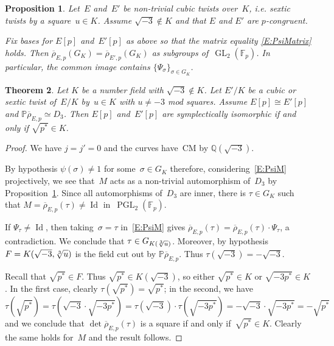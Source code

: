 \documentclass[12pt, reqno]{amsart}
\newcommand{\F}{\mathbb{F}}
\newcommand{\PP}{\mathbb{P}}
\newcommand{\Q}{\mathbb{Q}}
\newcommand{\rhobar}{{\overline{\rho}}}
\newcommand{\GL}{\operatorname{GL}}
\newcommand{\PGL}{\operatorname{PGL}}
\DeclareMathOperator{\Id}{Id}
\numberwithin{equation}{section}
\newtheorem{theorem}{Theorem}[section]
\newtheorem{proposition}[theorem]{Proposition}
\theoremstyle{definition}
\theoremstyle{remark}
\begin{document}
\begin{proposition} \label{P:PsiInImage}
Let~$E$ and~$E'$ be non-trivial cubic twists over~$K$, i.e. sextic twists by a square~$u \in K$. Assume $\sqrt{-3} \not\in K$ and that $E$ and $E'$ are $p$-congruent.

Fix bases for $E[p]$ and~$E'[p]$ as above so that the matrix equality \eqref{E:PsiMatrix} holds. Then 
$\rhobar_{E,p}(G_K) = \rhobar_{E',p}(G_K)$ 
as subgroups of~$\GL_2(\F_p)$. In particular, the common image contains $\{ \Psi_\sigma \}_{\sigma \in G_K}$.
\end{proposition}


\begin{theorem}\label{T:cubicM} 
Let $K$ be a number field with $\sqrt{-3} \not\in K$. 
Let $E'/K$ be a cubic or sextic twist of~$E/K$ by~$u \in K$ with $u \neq -3$ mod squares. Assume $E[p] \cong E'[p]$
and $\PP \rhobar_{E,p} \simeq D_3$.
Then $E[p]$ and~$E'[p]$ are symplectically isomorphic if and only if
$\sqrt{p^*} \in K$.
\end{theorem}
\begin{proof} We have $j=j'=0$ and the curves have~CM by $\Q(\sqrt{-3})$.

By hypothesis $\psi(\sigma) \neq 1$ for some~$\sigma \in G_K$ therefore, 
considering~\eqref{E:PsiM} projectively, we see that~$M$ acts as a non-trivial automorphism of~$D_3$ by Proposition~\ref{P:PsiInImage}.
Since all automorphisms of~$D_3$ are inner, 
there is $\tau \in G_K$ such that 
$M = \rhobar_{E,p}(\tau) \neq \Id$ in~$\PGL_2(\F_p)$.

If $\Psi_\tau \neq \Id$, then   
taking~$\sigma = \tau$ in~\eqref{E:PsiM} 
gives
$\rhobar_{E,p}(\tau) = \rhobar_{E,p}(\tau) \cdot \Psi_\tau$, a contradiction. We conclude that
$\tau \in G_{K(\root3\of{u})}$. 
Moreover, by hypothesis
$F = K(\sqrt{-3},\root3\of{u})$ is
the field cut out by $\PP \rhobar_{E,p}$. 
Thus $\tau(\sqrt{-3}) = - \sqrt{-3}$.

Recall that $\sqrt{p^*} \in F$.
Thus $\sqrt{p^*} \in K(\sqrt{-3})$, so either $\sqrt{p^*} \in K$ or $\sqrt{-3p^*} \in K$. In the first case, clearly $\tau(\sqrt{p^*}) = \sqrt{p^*}$; in the second, we have 
\[
 \tau(\sqrt{p^*}) = \tau(\sqrt{-3}\cdot\sqrt{-3p^*}) = \tau(\sqrt{-3}) \cdot \tau(\sqrt{-3p^*})= - \sqrt{-3} \cdot \sqrt{-3p^*} = - \sqrt{p^*}
\]
and we conclude that $\det \rhobar_{E,p}(\tau)$ is a square if and only if~$\sqrt{p^*} \in K$. Clearly the same holds for~$M$ and the result follows.
\end{proof}
\end{document}
